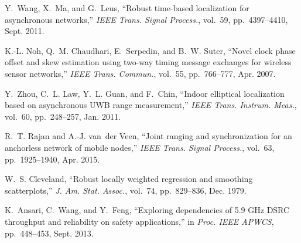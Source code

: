 \documentclass[12pt,journal,final,onecolumn]{IEEEtran}
\theoremstyle{definition}
\theoremstyle{myremark}
\begin{document}
\begin{thebibliography}{10}
Y.~Wang, X.~Ma, and G.~Leus, ``Robust time-based localization for asynchronous
  networks,'' {\em IEEE Trans. Signal Process.}, vol.~59, pp.~4397--4410, Sept.
  2011.

K.-L. Noh, Q.~M. Chaudhari, E.~Serpedin, and B.~W. Suter, ``Novel clock phase
  offset and skew estimation using two-way timing message exchanges for
  wireless sensor networks,'' {\em IEEE Trans. Commun.}, vol.~55, pp.~766--777,
  Apr. 2007.

Y.~Zhou, C.~L. Law, Y.~L. Guan, and F.~Chin, ``Indoor elliptical localization
  based on asynchronous {UWB} range measurement,'' {\em IEEE Trans. Instrum.
  Meas.}, vol.~60, pp.~248--257, Jan. 2011.

R.~T. Rajan and A.-J. van~der Veen, ``Joint ranging and synchronization for an
  anchorless network of mobile nodes,'' {\em IEEE Trans. Signal Process.},
  vol.~63, pp.~1925--1940, Apr. 2015.

W.~S. Cleveland, ``Robust locally weighted regression and smoothing
  scatterplots,'' {\em J. Am. Stat. Assoc.}, vol.~74, pp.~829--836, Dec. 1979.

K.~Ansari, C.~Wang, and Y.~Feng, ``Exploring dependencies of 5.9 {GHz} {DSRC}
  throughput and reliability on safety applications,'' in {\em Proc. IEEE
  APWCS}, pp.~448--453, Sept. 2013.

\end{thebibliography}
\end{document}
